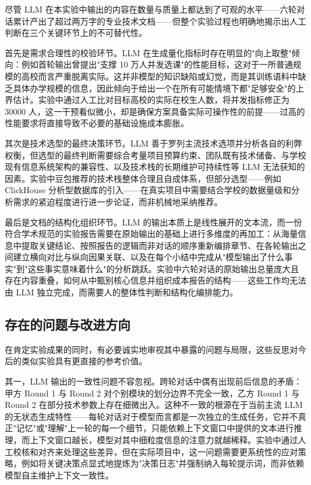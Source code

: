 \documentclass[12pt, a4paper]{academics}
\begin{document}
尽管 LLM 在本实验中输出的内容在数量与质量上都达到了可观的水平——六轮对话累计产出了超过两万字的专业技术文档——但整个实验过程也明确地揭示出人工判断在三个关键环节上的不可替代性。

首先是需求合理性的校验环节。LLM 在生成量化指标时存在明显的"向上取整"倾向：例如首轮输出曾提出"支撑 10 万人并发选课"的性能目标，这对于一所普通规模的高校而言严重脱离实际。这并非模型的知识缺陷或幻觉，而是其训练语料中缺乏具体办学规模的信息，因此倾向于给出一个在所有可能情境下都"足够安全"的上界估计。实验中通过人工比对目标高校的实际在校生人数，将并发指标修正为 30000 人，这一干预看似微小，却是确保方案具备实际可操作性的前提——过高的性能要求将直接导致不必要的基础设施成本膨胀。

其次是技术选型的最终决策环节。LLM 善于罗列主流技术选项并分析各自的利弊权衡，但选型的最终判断需要综合考量项目预算约束、团队既有技术储备、与学校现有信息系统架构的兼容性、以及技术栈的长期维护可持续性等 LLM 无法获知的因素。实验中豆包推荐的技术栈整体合理且自成体系，但部分选型——例如 ClickHouse 分析型数据库的引入——在真实项目中需要结合学校的数据量级和分析需求的紧迫程度进行进一步论证，而非机械地采纳推荐。

最后是文档的结构化组织环节。LLM 的输出本质上是线性展开的文本流，而一份符合学术规范的实验报告需要在原始输出的基础上进行多维度的再加工：从海量信息中提取关键结论、按照报告的逻辑而非对话的顺序重新编排章节、在各轮输出之间建立横向对比与纵向因果关联、以及在每个小结中完成从"模型输出了什么事实"到"这些事实意味着什么"的分析跳跃。实验中六轮对话的原始输出总量庞大且存在内容重叠，如何从中甄别核心信息并组织成本报告的结构——这些工作均无法由 LLM 独立完成，而需要人的整体性判断和结构化编排能力。

\subsection{存在的问题与改进方向}

在肯定实验成果的同时，有必要诚实地审视其中暴露的问题与局限，这些反思对今后的类似实验具有更直接的参考价值。

其一，LLM 输出的一致性问题不容忽视。跨轮对话中偶有出现前后信息的矛盾：甲方 Round 1 与 Round 2 对个别模块的划分边界不完全一致，乙方 Round 1 与 Round 2 在部分技术参数上存在细微出入。这种不一致的根源在于当前主流 LLM 的无状态生成特性——每轮对话对于模型而言都是一次独立的生成任务，它并不真正"记忆"或"理解"上一轮的每一个细节，只能依赖上下文窗口中提供的文本进行推理，而上下文窗口越长，模型对其中细粒度信息的注意力就越稀释。实验中通过人工校核和对齐来处理这些差异，但在实际项目中，这一问题需要更系统性的应对策略，例如将关键决策点显式地提炼为"决策日志"并强制纳入每轮提示词，而非依赖模型自主维护上下文一致性。
\end{document}
